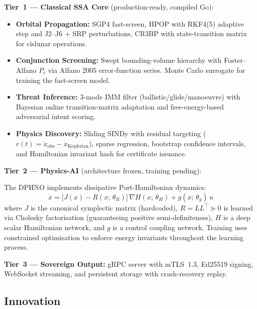 \documentclass[11pt,a4paper]{article}
\begin{document}
\textbf{Tier~1 --- Classical SSA Core} (production-ready, compiled Go):

\begin{itemize}
\item \textbf{Orbital Propagation:}
      SGP4 fast-screen, HPOP with RKF4(5) adaptive step and J2--J6 + SRP
      perturbations, CR3BP with state-transition matrix for cislunar operations.

\item \textbf{Conjunction Screening:}
      Swept bounding-volume hierarchy with Foster--Alfano $P_c$ via Alfano 2005
      error-function series. Monte Carlo surrogate for training the fast-screen model.

\item \textbf{Threat Inference:}
      3-mode IMM filter (ballistic/glide/manoeuvre) with Bayesian online
      transition-matrix adaptation and free-energy-based adversarial intent scoring.

\item \textbf{Physics Discovery:}
      Sliding SINDy with residual targeting
      ($r(t) = \ddot{x}_{\text{obs}} - \ddot{x}_{\text{Keplerian}}$),
      sparse regression, bootstrap confidence intervals, and Hamiltonian
      invariant hash for certificate issuance.
\end{itemize}

\textbf{Tier~2 --- Physics-AI} (architecture frozen, training pending):

The DPHNO implements dissipative Port-Hamiltonian dynamics:
\begin{equation}
\dot{x} = \bigl[J(x) - R(x;\,\theta_R)\bigr]\,\nabla H(x;\,\theta_H) + g(x;\,\theta_g)\,u
\label{eq:phs}
\end{equation}
where $J$ is the canonical symplectic matrix (hardcoded), $R = LL^\top \succeq 0$
is learned via Cholesky factorisation (guaranteeing positive semi-definiteness),
$H$ is a deep scalar Hamiltonian network, and $g$ is a control coupling network.
Training uses constrained optimisation to enforce energy invariants throughout
the learning process.

\textbf{Tier~3 --- Sovereign Output:} gRPC server with mTLS~1.3, Ed25519 signing,
WebSocket streaming, and persistent storage with crash-recovery replay.

\subsection{Innovation}
\end{document}
